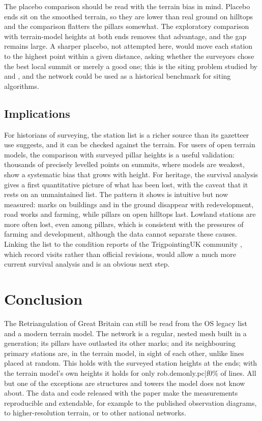 \documentclass[11pt,a4paper]{article}
\begin{document}
The placebo comparison should be read with the terrain bias in mind. Placebo ends sit on the smoothed terrain, so they are lower than real ground on hilltops and the comparison flatters the pillars somewhat. The exploratory comparison with terrain-model heights at both ends removes that advantage, and the gap remains large. A sharper placebo, not attempted here, would move each station to the highest point within a given distance, asking whether the surveyors chose the best local summit or merely a good one; this is the siting problem studied by \citet{lee1991} and \citet{kim2004}, and the network could be used as a historical benchmark for siting algorithms.

\subsection{Implications}
For historians of surveying, the station list is a richer source than its gazetteer use suggests, and it can be checked against the terrain. For users of open terrain models, the comparison with surveyed pillar heights is a useful validation: thousands of precisely levelled points on summits, where models are weakest, show a systematic bias that grows with height. For heritage, the survival analysis gives a first quantitative picture of what has been lost, with the caveat that it rests on an unmaintained list. The pattern it shows is intuitive but now measured: marks on buildings and in the ground disappear with redevelopment, road works and farming, while pillars on open hilltops last. Lowland stations are more often lost, even among pillars, which is consistent with the pressures of farming and development, although the data cannot separate these causes. Linking the list to the condition reports of the TrigpointingUK community \citep{tukpillar}, which record visits rather than official revisions, would allow a much more current survival analysis and is an obvious next step.

\section{Conclusion}\label{sec:conc}
The Retriangulation of Great Britain can still be read from the OS legacy list and a modern terrain model. The network is a regular, nested mesh built in a generation; its pillars have outlasted its other marks; and its neighbouring primary stations are, in the terrain model, in sight of each other, unlike lines placed at random. This holds with the surveyed station heights at the ends; with the terrain model's own heights it holds for only {{rob.demonly.pc|f0}}\% of lines. All but one of the exceptions are structures and towers the model does not know about. The data and code released with the paper make the measurements reproducible and extendable, for example to the published observation diagrams, to higher-resolution terrain, or to other national networks.
\end{document}
